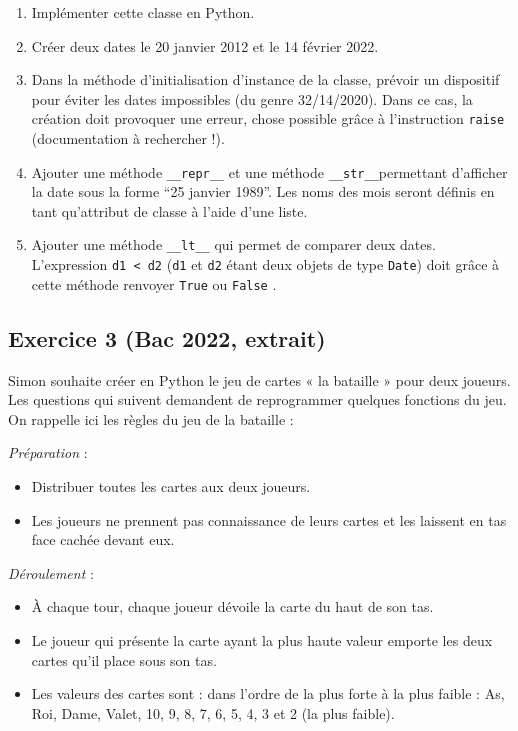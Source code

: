 \documentclass[
  letterpaper,
  DIV=11,
  numbers=noendperiod]{scrartcl}
\providecommand{\tightlist}{%
  \setlength{\itemsep}{0pt}\setlength{\parskip}{0pt}}\usepackage{longtable,booktabs,array}
\begin{document}
\begin{enumerate}
\def\labelenumi{\arabic{enumi}.}
\tightlist
\item
  Implémenter cette classe en Python.
\item
  Créer deux dates le 20 janvier 2012 et le 14 février 2022.
\item
  Dans la méthode d'initialisation d'instance de la classe, prévoir un
  dispositif pour éviter les dates impossibles (du genre 32/14/2020).
  Dans ce cas, la création doit provoquer une erreur, chose possible
  grâce à l'instruction \texttt{raise} (documentation à rechercher !).
\item
  Ajouter une méthode \texttt{\_\_repr\_\_} et une méthode
  \texttt{\_\_str\_\_}permettant d'afficher la date sous la forme ``25
  janvier 1989''. Les noms des mois seront définis en tant qu'attribut
  de classe à l'aide d'une liste.
\item
  Ajouter une méthode \texttt{\_\_lt\_\_} qui permet de comparer deux
  dates. L'expression \texttt{d1\ \textless{}\ d2} (\texttt{d1} et
  \texttt{d2} étant deux objets de type \texttt{Date}) doit grâce à
  cette méthode renvoyer \texttt{True} ou \texttt{False} .
\end{enumerate}

\hypertarget{fa-solid-pencil-alt-exercice-3-bac-2022-extrait}{%
\subsection{\texorpdfstring{ Exercice 3 (Bac 2022,
extrait)}{ Exercice 3 (Bac 2022, extrait)}}\label{fa-solid-pencil-alt-exercice-3-bac-2022-extrait}}

Simon souhaite créer en Python le jeu de cartes « la bataille » pour
deux joueurs. Les questions qui suivent demandent de reprogrammer
quelques fonctions du jeu. On rappelle ici les règles du jeu de la
bataille :

\emph{Préparation} :

\begin{itemize}
\tightlist
\item
  Distribuer toutes les cartes aux deux joueurs.
\item
  Les joueurs ne prennent pas connaissance de leurs cartes et les
  laissent en tas face cachée devant eux.
\end{itemize}

\emph{Déroulement} :

\begin{itemize}
\tightlist
\item
  À chaque tour, chaque joueur dévoile la carte du haut de son tas.
\item
  Le joueur qui présente la carte ayant la plus haute valeur emporte les
  deux cartes qu'il place sous son tas.
\item
  Les valeurs des cartes sont : dans l'ordre de la plus forte à la plus
  faible : As, Roi, Dame, Valet, 10, 9, 8, 7, 6, 5, 4, 3 et 2 (la plus
  faible).
\end{itemize}
\end{document}
